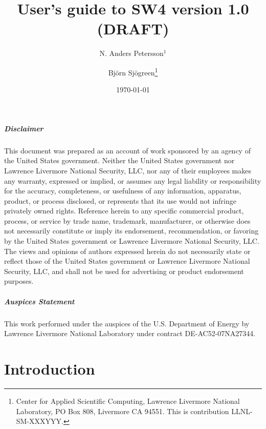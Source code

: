 \documentclass[11pt]{report}
\begin{document}
\title{\LARGE User's guide to SW4 version 1.0 (DRAFT)} 

\author{ N. Anders Petersson$^1$ \and Bj\"orn Sj\"ogreen\thanks{Center for Applied Scientific
     Computing, Lawrence Livermore National Laboratory, PO Box 808, Livermore CA 94551. This is
     contribution LLNL-SM-XXXYYY.}}
\date{\today} 
\maketitle


\paragraph {Disclaimer} 
This document was prepared as an account of work sponsored by an agency of the United States
government. Neither the United States government nor Lawrence Livermore National Security, LLC, nor
any of their employees makes any warranty, expressed or implied, or assumes any legal liability or
responsibility for the accuracy, completeness, or usefulness of any information, apparatus, product,
or process disclosed, or represents that its use would not infringe privately owned
rights. Reference herein to any specific commercial product, process, or service by trade name,
trademark, manufacturer, or otherwise does not necessarily constitute or imply its endorsement,
recommendation, or favoring by the United States government or Lawrence Livermore National Security,
LLC. The views and opinions of authors expressed herein do not necessarily state or reflect those of
the United States government or Lawrence Livermore National Security, LLC, and shall not be used for
advertising or product endorsement purposes. 

\paragraph{Auspices Statement}
This work performed under the auspices of the U.S. Department of Energy by Lawrence Livermore
National Laboratory under contract DE-AC52-07NA27344.
\tableofcontents


\chapter{Introduction}
\end{document}
